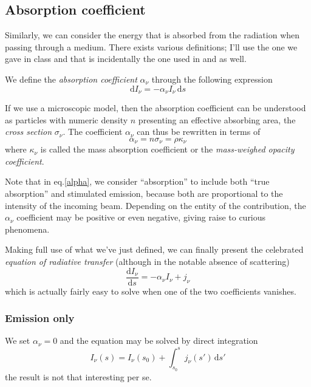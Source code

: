 \subsection*{Absorption coefficient}
Similarly, we can consider the energy that is absorbed from the radiation when passing through a medium. There exists various definitions; I'll use the one we gave in class and that is incidentally the one used in \cite{choudhuri} and \cite{1986rpa..book.....R} as well.
\par We define the \emph{absorption coefficient} $\alpha_{\nu}$ through the following expression
\begin{equation}
	\text{d}I_{\nu} = -\alpha_{\nu}I_{\nu}\,\text{d}s
	\label{alpha}
\end{equation}
\par If we use a microscopic model, then the absorption coefficient can be understood as particles with numeric density $n$ presenting an effective absorbing area, the \emph{cross section} $\sigma_{\nu}$. The coefficient $\alpha_{\nu}$ can thus be rewritten in terms of
\begin{equation*}
	\alpha_{\nu} = n\sigma_{\nu} = \rho \kappa_{\nu}
	\label{eq:absorption_coeff}
\end{equation*}
where $\kappa_{\nu}$ is called the mass absorption coefficient or the \emph{mass-weighed opacity coefficient}.
\par Note that in eq.\ref{alpha}, we consider “absorption” to include both “true absorption” and stimulated emission, because both are proportional to the intensity of the incoming beam. Depending on the entity of the contribution, the $\alpha_{\nu}$ coefficient may be positive or even negative, giving raise to curious phenomena.
\vspace{0.5cm}
\par Making full use of what we've just defined, we can finally present the celebrated \emph{equation of radiative transfer} (although in the notable absence of scattering)
\begin{equation}
	\frac{\text{d}I_{\nu}}{\text{d}s} = -\alpha_{\nu}I_{\nu}+j_{\nu}
	\label{eq:rt}
\end{equation}
which is actually fairly easy to solve when one of the two coefficients vanishes.
\subsubsection*{Emission only}
We set $\alpha_{\nu} = 0$ and the equation may be solved by direct integration
\begin{equation*}
	I_{\nu}(s) = I_{\nu}(s_{0})+\int_{s_{0}}^{s} j_{\nu}(s')\,\text{d}s'
\end{equation*}
the result is not that interesting per se.
